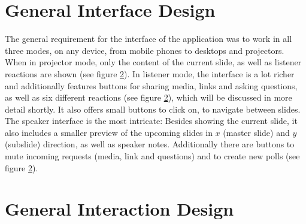 

\section{General Interface Design}
The general requirement for the interface of the application was to work in all three modes, on any device, from mobile phones to desktops and projectors. When in projector mode, only the content of the current slide, as well as listener reactions are shown (see figure \ref{}). In listener mode, the interface is a lot richer and additionally features buttons for sharing media, links and asking questions, as well as six different reactions (see figure \ref{}), which will be discussed in more detail shortly. It also offers small buttons to click on, to navigate between slides. The speaker interface is the most intricate: Besides showing the current slide, it also includes a smaller preview of the upcoming slides in $x$ (master slide) and $y$ (subslide) direction, as well as speaker notes. Additionally there are buttons to mute incoming requests (media, link and questions) and to create new polls (see figure \ref{}).

\section{General Interaction Design}







